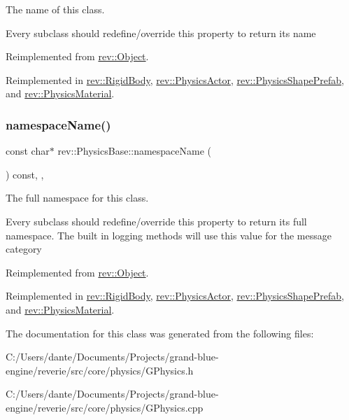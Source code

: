 The name of this class. 

Every subclass should redefine/override this property to return its name 

Reimplemented from \mbox{\hyperlink{classrev_1_1_object_a7a2013f91169479b65cf93afdc5d9a68}{rev\+::\+Object}}.



Reimplemented in \mbox{\hyperlink{classrev_1_1_rigid_body_a996230070162f743c3e87f5c20fd981e}{rev\+::\+Rigid\+Body}}, \mbox{\hyperlink{classrev_1_1_physics_actor_a5bc3e96948718546204f3201971e1914}{rev\+::\+Physics\+Actor}}, \mbox{\hyperlink{classrev_1_1_physics_shape_prefab_a674652fd1f620a4b987f86e2fc2d8f74}{rev\+::\+Physics\+Shape\+Prefab}}, and \mbox{\hyperlink{classrev_1_1_physics_material_ad5c1131d40a32771183345da25d1a38c}{rev\+::\+Physics\+Material}}.

\mbox{\label{classrev_1_1_physics_base_acf58cc81cff2ca957dcc68fe9a9a84a1}} 
\subsubsection{\texorpdfstring{namespaceName()}{namespaceName()}}
{\footnotesize\ttfamily const char$\ast$ rev\+::\+Physics\+Base\+::namespace\+Name (\begin{DoxyParamCaption}{ }\end{DoxyParamCaption}) const\hspace{0.3cm}{\ttfamily [inline]}, {\ttfamily [override]}, {\ttfamily [virtual]}}



The full namespace for this class. 

Every subclass should redefine/override this property to return its full namespace. The built in logging methods will use this value for the message category 

Reimplemented from \mbox{\hyperlink{classrev_1_1_object_aaeb638d3e10f361c56c211a318a27f3d}{rev\+::\+Object}}.



Reimplemented in \mbox{\hyperlink{classrev_1_1_rigid_body_ae8e178b51dbe0e61ad0674e039864a92}{rev\+::\+Rigid\+Body}}, \mbox{\hyperlink{classrev_1_1_physics_actor_ad212df8d7d61f9b855bc9d9ede2b437f}{rev\+::\+Physics\+Actor}}, \mbox{\hyperlink{classrev_1_1_physics_shape_prefab_a2b7e566022a8f94246d92e392ebb2079}{rev\+::\+Physics\+Shape\+Prefab}}, and \mbox{\hyperlink{classrev_1_1_physics_material_a6f593676796ebfff0aec28984f7b34b0}{rev\+::\+Physics\+Material}}.



The documentation for this class was generated from the following files\+:\begin{DoxyCompactItemize}
\item 
C\+:/\+Users/dante/\+Documents/\+Projects/grand-\/blue-\/engine/reverie/src/core/physics/G\+Physics.\+h\item 
C\+:/\+Users/dante/\+Documents/\+Projects/grand-\/blue-\/engine/reverie/src/core/physics/G\+Physics.\+cpp\end{DoxyCompactItemize}
